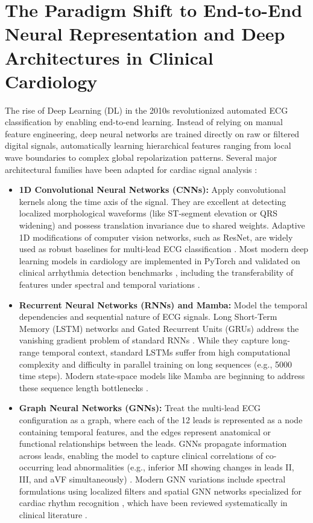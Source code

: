 \documentclass[12pt,a4paper]{report}
\begin{document}
\section{The Paradigm Shift to End-to-End Neural Representation and Deep Architectures in Clinical Cardiology}
The rise of Deep Learning (DL) in the 2010s revolutionized automated ECG classification by enabling end-to-end learning. Instead of relying on manual feature engineering, deep neural networks are trained directly on raw or filtered digital signals, automatically learning hierarchical features ranging from local wave boundaries to complex global repolarization patterns. Several major architectural families have been adapted for cardiac signal analysis \cite{lecun2015deep, goodfellow2016deep}:
\begin{itemize}
    \item \textbf{1D Convolutional Neural Networks (CNNs):} Apply convolutional kernels along the time axis of the signal. They are excellent at detecting localized morphological waveforms (like ST-segment elevation or QRS widening) and possess translation invariance due to shared weights. Adaptive 1D modifications of computer vision networks, such as ResNet, are widely used as robust baselines for multi-lead ECG classification \cite{kiranyaz2016real, rajpurkar2017cardiologist, ribeiro2020automatic}. Most modern deep learning models in cardiology are implemented in PyTorch \cite{pytorchdocs} and validated on clinical arrhythmia detection benchmarks \cite{hannun2020automatic}, including the transferability of features under spectral and temporal variations \cite{weimann2021transfer}.
    \item \textbf{Recurrent Neural Networks (RNNs) and Mamba:} Model the temporal dependencies and sequential nature of ECG signals. Long Short-Term Memory (LSTM) networks and Gated Recurrent Units (GRUs) address the vanishing gradient problem of standard RNNs \cite{hochreiter1997lstm, schuster1997bidirectional}. While they capture long-range temporal context, standard LSTMs suffer from high computational complexity and difficulty in parallel training on long sequences (e.g., 5000 time steps). Modern state-space models like Mamba are beginning to address these sequence length bottlenecks \cite{lipton2016learning, deep2024classification, smisek2018cardiac, zihlmann2017convolutional}.
    \item \textbf{Graph Neural Networks (GNNs):} Treat the multi-lead ECG configuration as a graph, where each of the 12 leads is represented as a node containing temporal features, and the edges represent anatomical or functional relationships between the leads. GNNs propagate information across leads, enabling the model to capture clinical correlations of co-occurring lead abnormalities (e.g., inferior MI showing changes in leads II, III, and aVF simultaneously) \cite{scarselli2008graph, kipf2016semi, velickovic2017graph, hamilton2017inductive, zhang2021ecggnn}. Modern GNN variations include spectral formulations using localized filters \cite{bruna2013spectral, defferrard2016convolutional} and spatial GNN networks specialized for cardiac rhythm recognition \cite{nonaka2021deep}, which have been reviewed systematically in clinical literature \cite{muller2026application}.

\end{itemize}
\end{document}
